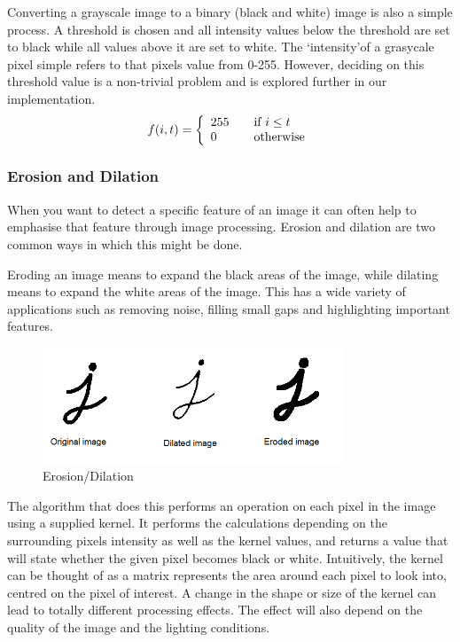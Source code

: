 Converting a grayscale image to a binary (black and white) image is also a simple process. A threshold is chosen and all intensity values below the threshold are set to black while all values above it are set to white. The \lq intensity\rq  of a grasycale pixel simple refers to that pixels value from 0-255. However, deciding on this threshold value is a non-trivial problem and is explored further in our implementation.   
\[ f(i,t) = \left\{ 
  \begin{array}{l l}
    255 & \quad \text{if } i \leq  t\\
    0   & \quad \text{otherwise}
  \end{array} \right.\]

        \subsubsection{Erosion and Dilation} \label{sec:erosion}

When you want to detect a specific feature of an image it can often help to emphasise that feature through image processing. Erosion and dilation are two common ways in which this might be done.

Eroding an image means to expand the black areas of the image, while dilating means to expand the white areas of the image. This has a wide variety of applications such as removing noise, filling small gaps and highlighting important features.
            \begin{figure}[ht!]
                \centering
                \includegraphics[width=90mm]{./assets/dilated.png}
                \caption{Erosion/Dilation}
                \label{image:dilationerosion}
            \end{figure}

The algorithm that does this performs an operation on each pixel in the image using a supplied kernel. It performs the calculations depending on the surrounding pixels intensity as well as the kernel values, and returns a value that will state whether the given pixel becomes black or white. Intuitively, the kernel can be thought of as a matrix represents the area around each pixel to look into, centred on the pixel of interest. A change in the shape or size of the kernel can lead to totally different processing effects. The effect will also depend on the quality of the image and the lighting conditions.

